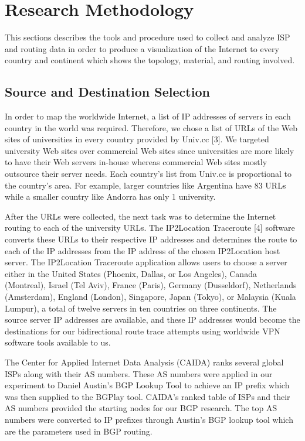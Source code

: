 \documentclass{sigcomm-alternate}
\begin{document}
\section{Research Methodology}
This sections describes the tools and procedure used to collect and analyze ISP and routing data in order to produce a visualization of the Internet to every country and continent which shows the topology, material, and routing involved.

\subsection{Source and Destination Selection}
In order to map the worldwide Internet, a list of IP addresses of servers in each country in the world was required. Therefore, we chose a list of URLs of the Web sites of universities in every country provided by Univ.cc [3]. We targeted university Web sites over commercial Web sites since universities are more likely to have their Web servers in-house whereas commercial Web sites mostly outsource their server needs. Each country’s list from Univ.cc is proportional to the country’s area. For example, larger countries like Argentina have 83 URLs while a smaller country like Andorra has only 1 university.  

After the URLs were collected, the next task was to determine the Internet routing to each of the university URLs. The IP2Location Traceroute [4] software converts these URLs to their respective IP addresses and determines the route to each of the IP addresses from the IP address of the chosen IP2Location host server. The IP2Location Traceroute application allows users to choose a server either in the United States (Phoenix, Dallas, or Los Angeles), Canada (Montreal), Israel (Tel Aviv), France (Paris), Germany (Dusseldorf), Netherlands (Amsterdam), England (London), Singapore, Japan (Tokyo), or Malaysia (Kuala Lumpur), a total of twelve servers in ten countries on three continents. The source server IP addresses are available, and these IP addresses would become the destinations for our bidirectional route trace attempts using worldwide VPN software tools available to us.

The Center for Applied Internet Data Analysis (CAIDA) ranks several global ISPs along with their AS numbers. These AS numbers were applied in our experiment to Daniel Austin’s BGP Lookup Tool to achieve an IP prefix which was then supplied to the BGPlay tool. CAIDA’s ranked table of ISPs and their AS numbers provided the starting nodes for our BGP research. The top AS numbers were converted to IP prefixes through Austin’s BGP lookup tool which are the parameters used in BGP routing.
\end{document}
